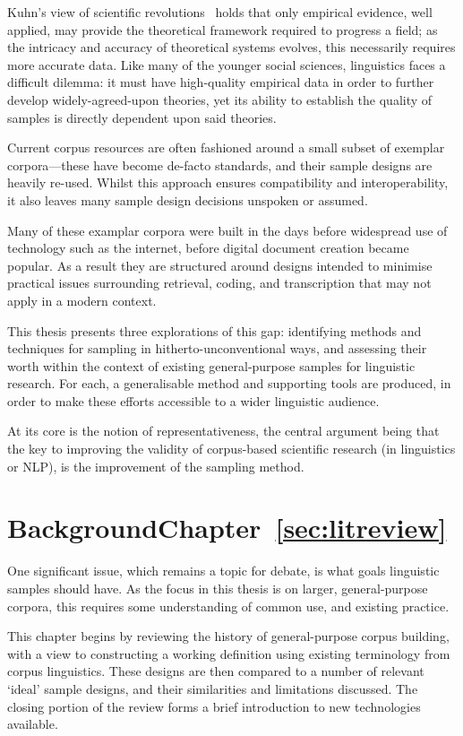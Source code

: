 

Kuhn's view of scientific revolutions~\cite{kuhn1970structure}
holds that only empirical evidence, well applied, may provide the theoretical framework required to progress a field; as the intricacy and accuracy of theoretical systems evolves, this necessarily requires more accurate data.  Like many of the younger social sciences, linguistics faces a difficult dilemma: it must have high-quality empirical data in order to further develop widely-agreed-upon theories, yet its ability to establish the quality of samples is directly dependent upon said theories.

Current corpus resources are often fashioned around a small subset of exemplar corpora---these have become de-facto standards, and their sample designs are heavily re-used.
Whilst this approach ensures compatibility and interoperability, it also leaves many sample design decisions unspoken or assumed.

Many of these examplar corpora were built in the days before widespread use of technology such as the internet, before digital document creation became popular.  As a result they are structured around designs intended to minimise practical issues surrounding retrieval, coding, and transcription that may not apply in a modern context.

This thesis presents three explorations of this gap: identifying methods and techniques for sampling in hitherto-unconventional ways, and assessing their worth within the context of existing general-purpose samples for linguistic research.  For each, a generalisable method and supporting tools are produced, in order to make these efforts accessible to a wider linguistic audience.

At its core is the notion of representativeness, the central argument being that the key to improving the validity of corpus-based scientific research (in linguistics or NLP), is the improvement of the sampling method.

\section*{Background\hfill{}Chapter~\ref{sec:litreview}}
One significant issue, which remains a topic for debate, is what goals linguistic samples should have.  As the focus in this thesis is on larger, general-purpose corpora, this requires some understanding of common use, and existing practice.

This chapter begins by reviewing the history of general-purpose corpus building, with a view to constructing a working definition using existing terminology from corpus linguistics.  These designs are then compared to a number of relevant `ideal' sample designs, and their similarities and limitations discussed.  The closing portion of the review forms a brief introduction to new technologies available.


